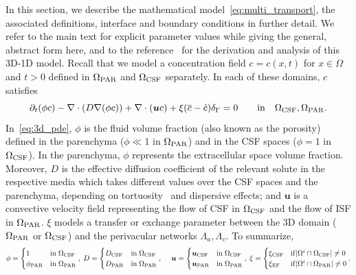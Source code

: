 In this section, we describe the mathematical
model~\eqref{eq:multi_transport}, the associated definitions,
interface and boundary conditions in further detail. We refer to the
main text for explicit parameter values while giving the general,
abstract form here, and to the reference~\cite{masri2023modelling} for
the derivation and analysis of this 3D-1D model. Recall that we model
a concentration field $c = c(x, t)$ for $x \in \Omega$ and $t > 0$
defined in $\Omega_{\rm PAR}$ and $\Omega_{\rm CSF}$ separately. In
each of these domains, $c$ satisfies
\begin{equation}
  \partial_t (\phi c) - \nabla \cdot (D \nabla (\phi c) ) + \nabla \cdot (\bm u c ) + \xi (\overline{c} - \hat c ) \delta_\Gamma
   = 0
  \quad \quad \mathrm{in} \quad \Omega_{\rm CSF}, \Omega_{\rm{PAR}}.
  \label{eq:3d_pde}
\end{equation}
In~\eqref{eq:3d_pde}, $\phi$ is the fluid volume fraction (also known as the porosity) defined in the parenchyma ($\phi \ll 1$ in $\Omega_{\rm PAR}$) and in the CSF spaces ($\phi = 1$ in $\Omega_{\rm CSF}$). In the parenchyma, $\phi$ represents the extracellular space volume fraction. Moreover, $D$ is the effective diffusion coefficient of the relevant solute in the respective media which takes different values over the CSF spaces and the parenchyma, depending on tortuosity~\cite{sykova2008diffusion} and dispersive effects; and $\bm u$ is a convective velocity field representing the flow of CSF in $\Omega_{\rm CSF}$ and the flow of ISF in $\Omega_{\rm PAR}$. $\xi$ models a transfer or exchange parameter between the 3D domain ($\Omega_{\rm PAR}$ or $\Omega_{\rm CSF}$) and the perivacular networks $\Lambda_a, \Lambda_v$. To summarize,
\begin{equation*}
\phi =  \begin{cases}
  1  & \mathrm{in} \;  \Omega_{\rm{CSF}} \\ 
  \phi_{\rm{PAR}} & \mathrm{in} \; \Omega_{\rm{PAR}} 
  \end{cases}, \; 
D = \begin{cases}
  D_{\rm{CSF}} & \mathrm{in} \;  \Omega_{\rm{CSF}} \\ 
  D_{\rm{PAR}} & \mathrm{in} \; \Omega_{\rm{PAR}} \end{cases}, \; 
  \quad \bm u  = \begin{cases}
  \bm{u}_{\rm{CSF}} & \mathrm{in} \; \Omega_{\rm{CSF}} \\ 
  \bm{u}_{\rm{PAR}} & \mathrm{in} \; \Omega_{\rm{PAR}} 
\end{cases}, \; 
\xi = \begin{cases}
  \xi_{\rm{CSF}} & \mathrm{if} |\Omega^i \cap \Omega_{\rm{CSF}}| \neq 0 \\
  \xi_{\rm{EF}} & \mathrm{if} |\Omega^i \cap \Omega_{\rm{PAR}}| \neq 0  
\end{cases} . 
\end{equation*}

